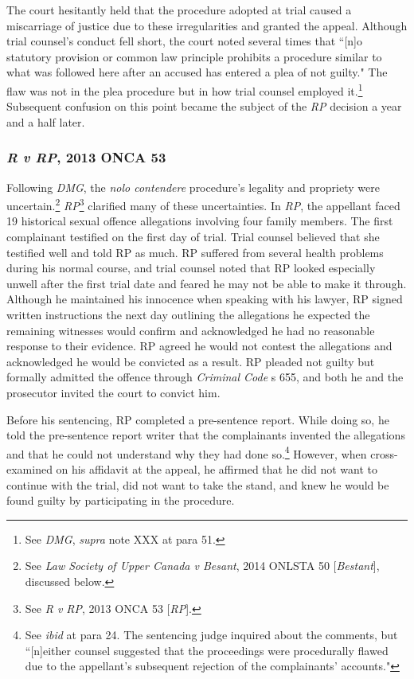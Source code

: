 The court hesitantly held that the procedure adopted at trial caused a miscarriage of justice due to these irregularities and granted the appeal. Although trial counsel's conduct fell short, the court noted several times that ``[n]o statutory provision or common law principle prohibits a procedure similar to what was followed here after an accused has entered a plea of not guilty." The flaw was not in the plea procedure but in how trial counsel employed it.\footnote{See \textit{DMG}, \textit{supra} note XXX at para 51.} Subsequent confusion on this point became the subject of the \textit{RP} decision a year and a half later.

\subsubsection{\textit{R v RP}, 2013 ONCA 53}

Following \textit{DMG}, the \textit{nolo contendere} procedure's legality and propriety were uncertain.\footnote{See \textit{Law Society of Upper Canada v Besant}, 2014 ONLSTA 50 [\textit{Bestant}], discussed below.} \textit{RP}\footnote{See \textit{R v RP}, 2013 ONCA 53 [\textit{RP}].} clarified many of these uncertainties. In \textit{RP}, the appellant faced 19 historical sexual offence allegations involving four family members. The first complainant testified on the first day of trial. Trial counsel believed that she testified well and told RP as much. RP suffered from several health problems during his normal course, and trial counsel noted that RP looked especially unwell after the first trial date and feared he may not be able to make it through. Although he maintained his innocence when speaking with his lawyer, RP signed written instructions the next day outlining the allegations he expected the remaining witnesses would confirm and acknowledged he had no reasonable response to their evidence. RP agreed he would not contest the allegations and acknowledged he would be convicted as a result. RP pleaded not guilty but formally admitted the offence through \textit{Criminal Code} s 655, and both he and the prosecutor invited the court to convict him.

Before his sentencing, RP completed a pre-sentence report. While doing so, he told the pre-sentence report writer that the complainants invented the allegations and that he could not understand why they had done so.\footnote{See \textit{ibid} at para 24. The sentencing judge inquired about the comments, but ``[n]either counsel suggested that the proceedings were procedurally flawed due to the appellant's subsequent rejection of the complainants' accounts."} However, when cross-examined on his affidavit at the appeal, he affirmed that he did not want to continue with the trial, did not want to take the stand, and knew he would be found guilty by participating in the procedure.


